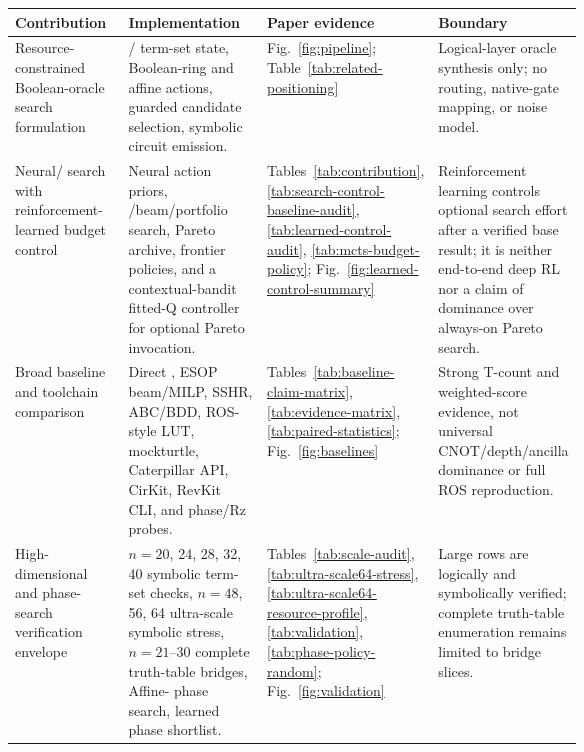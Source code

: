 \begin{tabularx}{\linewidth}{>{\raggedright\arraybackslash}p{0.20\linewidth}>{\raggedright\arraybackslash}X>{\raggedright\arraybackslash}p{0.22\linewidth}>{\raggedright\arraybackslash}p{0.24\linewidth}}
\toprule
Contribution & Implementation & Paper evidence & Boundary \\
\midrule
Resource-constrained Boolean-oracle search formulation & \anf{}/\fprm{} term-set state, Boolean-ring and affine actions, guarded candidate selection, symbolic circuit emission. & Fig.~\ref{fig:pipeline}; Table~\ref{tab:related-positioning} & Logical-layer oracle synthesis only; no routing, native-gate mapping, or noise model. \\
Neural/\mcts{} search with reinforcement-learned budget control & Neural action priors, \mcts{}/beam/portfolio search, Pareto archive, frontier policies, and a contextual-bandit fitted-Q controller for optional Pareto invocation. & Tables~\ref{tab:contribution}, \ref{tab:search-control-baseline-audit}, \ref{tab:learned-control-audit}, \ref{tab:mcts-budget-policy}; Fig.~\ref{fig:learned-control-summary} & Reinforcement learning controls optional search effort after a verified base result; it is neither end-to-end deep RL nor a claim of dominance over always-on Pareto search. \\
Broad baseline and toolchain comparison & Direct \anf{}, ESOP beam/MILP, SSHR, ABC/BDD, ROS-style LUT, mockturtle, Caterpillar API, CirKit, RevKit CLI, and phase/Rz probes. & Tables~\ref{tab:baseline-claim-matrix}, \ref{tab:evidence-matrix}, \ref{tab:paired-statistics}; Fig.~\ref{fig:baselines} & Strong T-count and weighted-score evidence, not universal CNOT/depth/ancilla dominance or full ROS reproduction. \\
High-dimensional and phase-search verification envelope & $n=20$, 24, 28, 32, 40 symbolic term-set checks, $n=48$, 56, 64 ultra-scale symbolic stress, $n=21$--$30$ complete truth-table bridges, Affine-\fprm{} phase search, learned phase shortlist. & Tables~\ref{tab:scale-audit}, \ref{tab:ultra-scale64-stress}, \ref{tab:ultra-scale64-resource-profile}, \ref{tab:validation}, \ref{tab:phase-policy-random}; Fig.~\ref{fig:validation} & Large rows are logically and symbolically verified; complete truth-table enumeration remains limited to bridge slices. \\
\bottomrule
\end{tabularx}
